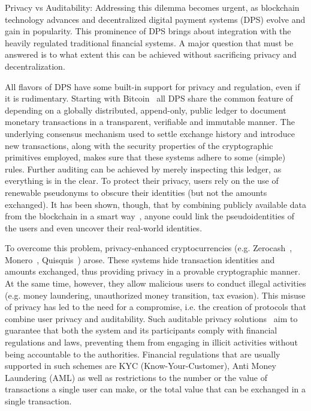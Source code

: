 Privacy vs Auditability: 
Addressing this dilemma becomes urgent, 
as blockchain technology advances and decentralized digital payment systems (DPS) evolve and gain in popularity.
This prominence of DPS brings about integration with the heavily regulated traditional financial systems. 
A major question that must be answered is to what extent this can be achieved without sacrificing privacy and decentralization. 

All flavors of DPS have some built-in support for privacy and regulation, even if it is rudimentary. 
Starting with Bitcoin~\cite{nakamoto2009bitcoin} all DPS share the common feature of depending on a globally distributed, append-only, public ledger to document monetary transactions in a transparent, verifiable and immutable manner. 
The underlying consensus mechanism used to settle exchange history and introduce new transactions, along with the security properties of the cryptographic primitives employed, makes sure that these systems adhere to some (simple) rules.  Further auditing can be achieved by merely inspecting this ledger, as everything is in the clear.   
To protect their privacy, users  rely on the use of renewable pseudonyms to obscure their identities (but not the amounts exchanged). 
It has been shown, though, that by combining publicly available data from the blockchain in a smart way~\cite{MeiklejohnPJLMV16}, anyone could link the pseudoidentities of the users and even uncover their real-world identities. 

To overcome this problem, privacy-enhanced cryptocurrencies (e.g. Zerocash~\cite{Zerocash}, Monero~\cite{Monero}, Quisquis~\cite{fauzi2019quisquis}) arose. These systems hide transaction identities and amounts exchanged, thus providing privacy in a provable cryptographic manner.
At the same time, however, they allow malicious users to conduct illegal activities (e.g. money laundering, unauthorized money transition, tax evasion). 
This misuse of privacy has led to the need for a compromise, i.e. the creation of protocols that combine user privacy and auditability. 
Such auditable privacy solutions~\cite{GGM16, PGC, Peredi, Pisces,zkLedger}
aim to guarantee that both the system and its participants comply with financial regulations and laws, preventing them from engaging in illicit activities without being accountable to the authorities.
Financial regulations that are usually supported in such schemes are KYC (Know-Your-Customer), Anti Money Laundering (AML) as well as restrictions to the number or the value of transactions a single user can make, or the total value that can be exchanged in a single transaction.

